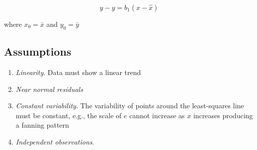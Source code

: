 \begin{equation}
	y - \hat{y} = b_1 (x - \hat{x})
\end{equation}

where $x_0 = \bar{x}$ and $y_0 = \bar{y}$

\subsection*{Assumptions}

\begin{enumerate}
	\item \textit{Linearity}. Data must show a linear trend
	\item \textit{Near normal residuals}
	\item \textit{Constant variability}. The variability of points around the least-squares line must be constant, e.g., the scale of $e$ cannot increase as $x$ increases producing a fanning pattern
	\item \textit{Independent observations}. 
\end{enumerate}

\hformbar








\newpage
